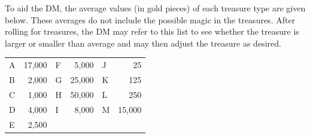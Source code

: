 \documentclass[letterpaper,serif,tightsqueeze]{rpg-module}
\begin{document}
To aid the DM, the average values (in gold pieces) of each treasure
type are given below. These averages do not include the possible
magic in the treasures. After rolling for treasures, the DM may refer
to this list to see whether the treasure is larger or smaller than
average and may then adjust the treasure as desired.

\begin{tabular}{>{\hfill}p{1cm} r >{\hfill}p{1cm} r >{\hfill}p{1cm} r}
A & 17,000 & F &  5,000 & J &     25\\
B &  2,000 & G & 25,000 & K &    125\\
C &  1,000 & H & 50,000 & L &    250\\
D &  4,000 & I &  8,000 & M & 15,000\\
E &  2,500\\
\end{tabular}
\end{document}
